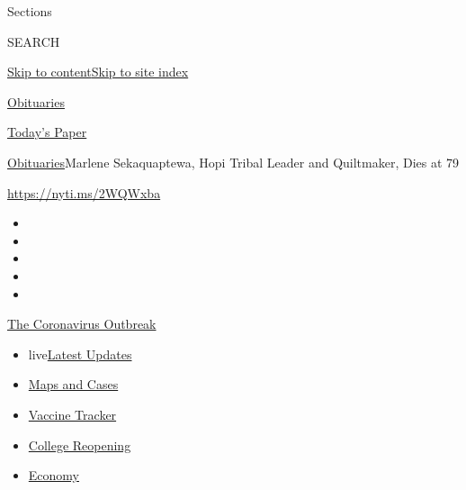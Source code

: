 Sections

SEARCH

\protect\hyperlink{site-content}{Skip to
content}\protect\hyperlink{site-index}{Skip to site index}

\href{https://www.nytimes.com/section/obituaries}{Obituaries}

\href{https://myaccount.nytimes.com/auth/login?response_type=cookie\&client_id=vi}{}

\href{https://www.nytimes.com/section/todayspaper}{Today's Paper}

\href{/section/obituaries}{Obituaries}\textbar{}Marlene Sekaquaptewa,
Hopi Tribal Leader and Quiltmaker, Dies at 79

\url{https://nyti.ms/2WQWxba}

\begin{itemize}
\item
\item
\item
\item
\item
\end{itemize}

\href{https://www.nytimes.com/news-event/coronavirus?action=click\&pgtype=Article\&state=default\&region=TOP_BANNER\&context=storylines_menu}{The
Coronavirus Outbreak}

\begin{itemize}
\tightlist
\item
  live\href{https://www.nytimes.com/2020/08/03/world/coronavirus-covid-19.html?action=click\&pgtype=Article\&state=default\&region=TOP_BANNER\&context=storylines_menu}{Latest
  Updates}
\item
  \href{https://www.nytimes.com/interactive/2020/us/coronavirus-us-cases.html?action=click\&pgtype=Article\&state=default\&region=TOP_BANNER\&context=storylines_menu}{Maps
  and Cases}
\item
  \href{https://www.nytimes.com/interactive/2020/science/coronavirus-vaccine-tracker.html?action=click\&pgtype=Article\&state=default\&region=TOP_BANNER\&context=storylines_menu}{Vaccine
  Tracker}
\item
  \href{https://www.nytimes.com/2020/08/02/us/covid-college-reopening.html?action=click\&pgtype=Article\&state=default\&region=TOP_BANNER\&context=storylines_menu}{College
  Reopening}
\item
  \href{https://www.nytimes.com/live/2020/08/03/business/stock-market-today-coronavirus?action=click\&pgtype=Article\&state=default\&region=TOP_BANNER\&context=storylines_menu}{Economy}
\end{itemize}

